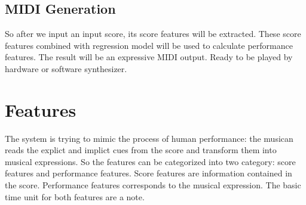       \subsection{MIDI Generation}
 So after we input an input score, its score features will be extracted. These score features combined with regression model will be used to calculate performance features. The result will be an expressive MIDI output. Ready to be played by hardware or software synthesizer.  
   
   \section{Features}
   The system is trying to mimic the process of human performance: the musican reads the explict and implict cues from the score and transform them into musical expressions. So the features can be categorized into two category: score features and performance features.  Score features are information contained in the score. Performance features corresponds to the musical expression. The basic time unit for both features are a note. 
